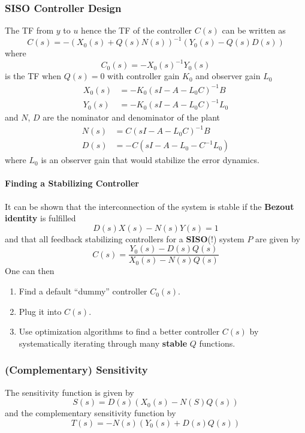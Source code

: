 \subsubsection{SISO Controller Design}
\newpar{}
The TF from $y$ to $u$ hence the TF of the controller $C(s)$ can be written as
\begin{equation*}
    C(s) = -{(X_0(s)+Q(s)N(s))}^{-1}(Y_0(s)-Q(s)D(s))
\end{equation*}
where
\begin{equation*}
    C_0(s)=-{X_0(s)}^{-1}Y_0(s)
\end{equation*}
is the TF when $Q(s)=0$ with controller gain $K_0$ and observer gain $L_0$
\noindent\begin{align*}
    X_0(s) & = -K_0{(sI-A-L_0C)}^{-1}B   \\
    Y_0(s) & = -K_0{(sI-A-L_0C)}^{-1}L_0
\end{align*}
and $N$, $D$ are the nominator and denominator of the plant
\begin{align*}
    N(s) & =C{(sI-A-L_0C)}^{-1}B    \\
    D(s) & = -C(sI-A-L_0-C^{-1}L_0)
\end{align*}
where $L_0$ is an observer gain that would stabilize the error dynamics.

\paragraph{Finding a Stabilizing Controller}
It can be shown that the interconnection of the system is stable if the \textbf{Bezout identity} is fulfilled
\begin{equation*}
    D(s)X(s)-N(s)Y(s)=1
\end{equation*}
and that all feedback stabilizing controllers for a \textbf{SISO}(!) system $P$ are given by
\begin{equation*}
    C(s) = \frac{Y_0(s) -D(s)Q(s)}{X_0(s)-N(s)Q(s)}
\end{equation*}
One can then
\begin{enumerate}
    \item Find a default ``dummy'' controller $C_0(s)$.
    \item Plug it into $C(s)$.
    \item Use optimization algorithms to find a better controller $C(s)$ by systematically iterating through many \textbf{stable} $Q$ functions.
\end{enumerate}

\subsubsection{(Complementary) Sensitivity}
The sensitivity function is given by
\begin{equation*}
    S(s) = D(s)(X_0(s)-N(S)Q(s))
\end{equation*}
and the complementary sensitivity function by
\begin{equation*}
    T(s) = -N(s)(Y_0(s)+D(s)Q(s))
\end{equation*}